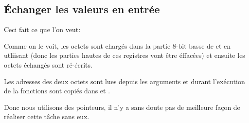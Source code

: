 \subsection{Échanger les valeurs en entrée}

Ceci fait ce que l'on veut:



Comme on le voit, les octets sont chargés dans la partie 8-bit basse de 
et  en utliisant  (donc les parties hautes de ces registres vont
être éffacées) et ensuite les octets échangés sont ré-écrits.



Les adresses des deux octets sont lues depuis les arguments et durant l'exécution
de la fonctions sont copiés dans  et .

Donc nous utilisons des pointeurs, il n'y a sans doute pas de meilleure façon de
réaliser cette tâche sans eux.

